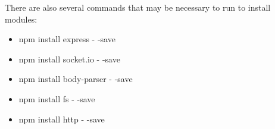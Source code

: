 \documentclass[11pt,oneside,a4paper]{article}
\begin{document}
There are also several commands that may be necessary to run to install modules:
\begin{itemize}
	\item npm install express - -save
	\item npm install socket.io - -save
	\item npm install body-parser - -save
	\item npm install fs - -save
	\item npm install http - -save
\end{itemize} 
\end{document}
